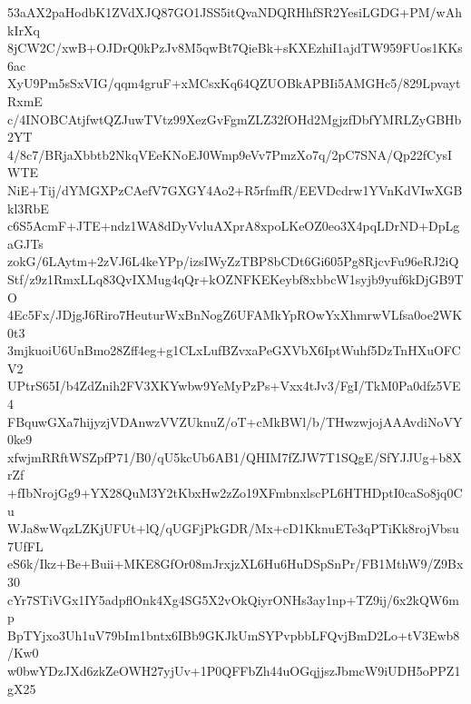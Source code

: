 53aAX2paHodbK1ZVdXJQ87GO1JSS5itQvaNDQRHhfSR2YesiLGDG+PM/wAhkIrXq
8jCW2C/xwB+OJDrQ0kPzJv8M5qwBt7QieBk+sKXEzhiI1ajdTW959FUos1KKs6ac
XyU9Pm5sSxVIG/qqm4gruF+xMCsxKq64QZUOBkAPBIi5AMGHc5/829LpvaytRxmE
c/4INOBCAtjfwtQZJuwTVtz99XezGvFgmZLZ32fOHd2MgjzfDbfYMRLZyGBHb2YT
4/8c7/BRjaXbbtb2NkqVEeKNoEJ0Wmp9eVv7PmzXo7q/2pC7SNA/Qp22fCysIWTE
NiE+Tij/dYMGXPzCAefV7GXGY4Ao2+R5rfmfR/EEVDcdrw1YVnKdVIwXGBkl3RbE
c6S5AcmF+JTE+ndz1WA8dDyVvluAXprA8xpoLKeOZ0eo3X4pqLDrND+DpLgaGJTs
zokG/6LAytm+2zVJ6L4keYPp/izsIWyZzTBP8bCDt6Gi605Pg8RjcvFu96eRJ2iQ
Stf/z9z1RmxLLq83QvIXMug4qQr+kOZNFKEKeybf8xbbcW1syjb9yuf6kDjGB9TO
4Ec5Fx/JDjgJ6Riro7HeuturWxBnNogZ6UFAMkYpROwYxXhmrwVLfsa0oe2WK0t3
3mjkuoiU6UnBmo28Zff4eg+g1CLxLufBZvxaPeGXVbX6IptWuhf5DzTnHXuOFCV2
UPtrS65I/b4ZdZnih2FV3XKYwbw9YeMyPzPs+Vxx4tJv3/FgI/TkM0Pa0dfz5VE4
FBquwGXa7hijyzjVDAnwzVVZUknuZ/oT+cMkBWl/b/THwzwjojAAAvdiNoVY0ke9
xfwjmRRftWSZpfP71/B0/qU5kcUb6AB1/QHIM7fZJW7T1SQgE/SfYJJUg+b8XrZf
+fIbNrojGg9+YX28QuM3Y2tKbxHw2zZo19XFmbnxlscPL6HTHDptI0caSo8jq0Cu
WJa8wWqzLZKjUFUt+lQ/qUGFjPkGDR/Mx+cD1KknuETe3qPTiKk8rojVbsu7UfFL
eS6k/Ikz+Be+Buii+MKE8GfOr08mJrxjzXL6Hu6HuDSpSnPr/FB1MthW9/Z9Bx30
cYr7STiVGx1IY5adpflOnk4Xg4SG5X2vOkQiyrONHs3ay1np+TZ9ij/6x2kQW6mp
BpTYjxo3Uh1uV79bIm1bntx6IBb9GKJkUmSYPvpbbLFQvjBmD2Lo+tV3Ewb8/Kw0
w0bwYDzJXd6zkZeOWH27yjUv+1P0QFFbZh44uOGqjjszJbmcW9iUDH5oPPZ1gX25
